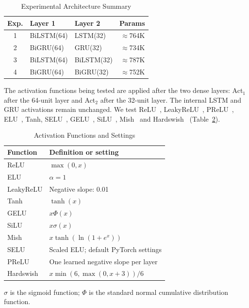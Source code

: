 \documentclass[conference,a4paper]{IEEEtran}
\begin{document}
\begin{table}[htbp]
  \caption{Experimental Architecture Summary}
  \label{tab:architectures}
  \centering
  \footnotesize
  \setlength{\tabcolsep}{4pt}
  \renewcommand{\arraystretch}{1.08}
  \begin{tabular}{cllr}
    \toprule
    Exp. & Layer 1 & Layer 2 & Params \\
    \midrule
    1 & BiLSTM(64) & LSTM(32)    & ${\approx}$764K \\
    2 & BiGRU(64)  & GRU(32)     & ${\approx}$734K \\
    3 & BiLSTM(64) & BiLSTM(32)  & ${\approx}$787K \\
    4 & BiGRU(64)  & BiGRU(32)   & ${\approx}$752K \\
    \bottomrule
  \end{tabular}
\end{table}

The activation functions being tested are applied after the
two dense layers: Act$_1$ after the 64-unit layer and Act$_2$
after the 32-unit layer. The internal LSTM and GRU activations
remain unchanged. We test ReLU~\cite{nair2010},
LeakyReLU~\cite{maas2013}, PReLU~\cite{he2015},
ELU~\cite{clevert2015}, Tanh, SELU~\cite{klambauer2017},
GELU~\cite{hendrycks2016}, SiLU~\cite{ramachandran2017},
Mish~\cite{misra2020} and Hardswish~\cite{howard2019}
(Table~\ref{tab:activations}).

\begin{table}[htbp]
  \caption{Activation Functions and Settings}
  \label{tab:activations}
  \centering\footnotesize
  \setlength{\tabcolsep}{4pt}
  \renewcommand{\arraystretch}{1.05}
  \begin{tabular}{ll}
    \toprule
    Function & Definition or setting \\
    \midrule
    ReLU      & $\max(0,x)$ \\
    ELU       & $\alpha=1$ \\
    LeakyReLU & Negative slope: 0.01 \\
    Tanh      & $\tanh(x)$ \\
    GELU      & $x\Phi(x)$ \\
    SiLU      & $x\sigma(x)$ \\
    Mish      & $x\tanh(\ln(1+e^x))$ \\
    SELU      & Scaled ELU; default PyTorch settings \\
    PReLU     & One learned negative slope per layer \\
    Hardswish & $x\min(6,\max(0,x+3))/6$ \\
    \bottomrule
  \end{tabular}
  \par\smallskip
  \parbox{\columnwidth}{\footnotesize
  $\sigma$ is the sigmoid function; $\Phi$ is the standard
  normal cumulative distribution function.}
\end{table}
\end{document}
